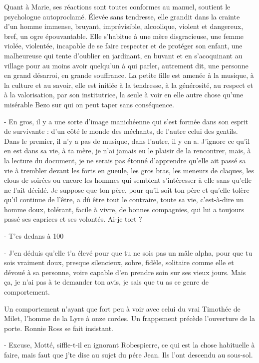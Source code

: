 Quant à Marie, ses réactions sont toutes conformes au manuel, soutient le psychologue autoproclamé. Élevée sans tendresse, elle grandit dans la crainte d’un homme immense, bruyant, imprévisible, alcoolique, violent et dangereux, bref, un ogre épouvantable. Elle s’habitue à une mère disgracieuse, une femme violée, violentée, incapable de se faire respecter et de protéger son enfant, une malheureuse qui tente d’oublier en jardinant, en buvant et en s’acoquinant au village pour au moins avoir quelqu’un à qui parler, autrement dit, une personne en grand désarroi, en grande souffrance. La petite fille est amenée à la musique, à la culture et au savoir, elle est initiée à la tendresse, à la générosité, au respect et à la valorisation, par son institutrice, la seule à voir en elle autre chose qu’une misérable Bezo sur qui on peut taper sans conséquence.

- En gros, il y a une sorte d’image manichéenne qui s’est formée dans son esprit de survivante : d’un côté le monde des méchants, de l’autre celui des gentils. Dans le premier, il n’y a pas de musique, dans l’autre, il y en a. J’ignore ce qu’il en est dans sa vie, à ta mère, je n’ai jamais eu le plaisir de la rencontrer, mais, à la lecture du document, je ne serais pas étonné d’apprendre qu’elle ait passé sa vie à trembler devant les forts en gueule, les gros bras, les meneurs de claques, les clous de soirées ou encore les hommes qui semblent s’intéresser à elle sans qu’elle ne l’ait décidé. Je suppose que ton père, pour qu’il soit ton père et qu’elle tolère qu’il continue de l’être, a dû être tout le contraire, toute sa vie, c’est-à-dire un homme doux, tolérant, facile à vivre, de bonnes compagnies, qui lui a toujours passé ses caprices et ses volontés. Ai-je tort ?

- T’es dedans à 100 %

- J’en déduis qu’elle t’a élevé pour que tu ne sois pas un mâle alpha, pour que tu sois vraiment doux, presque silencieux, sobre, fidèle, solitaire comme elle et dévoué à sa personne, voire capable d’en prendre soin sur ses vieux jours. Mais ça, je n’ai pas à te demander ton avis, je sais que tu as ce genre de comportement.

Un comportement n’ayant que fort peu à voir avec celui du vrai Timothée de Milet, l’homme de la Lyre à onze cordes.
Un frappement précède l’ouverture de la porte. Ronnie Ross se fait insistant.

- Excuse, Motté, siffle-t-il en ignorant Robespierre, ce qui est la chose habituelle à faire, mais faut que j’te dise au sujet du pére Jean. Ils l’ont descendu au sous-sol.


